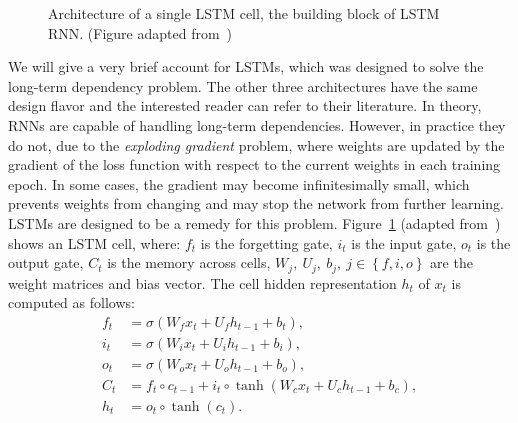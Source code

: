 \documentclass[journal,10pt,twocolumns,letter]{IEEEtran}
\begin{document}
\begin{figure}[!tb]


   \caption{Architecture of a single LSTM cell, the building block of LSTM RNN\@. (Figure adapted
    from~\cite{Colah2015UnderstandingLstmNetworks})}\label{lstm}
\end{figure}

We will give a very brief account for LSTMs, which was designed to solve the long-term dependency
problem. The other three architectures have the same design flavor and the interested reader can
refer to their literature. In theory, RNNs are capable of handling long-term dependencies. However,
in practice they do not, due to the \textit{exploding gradient} problem, where weights are updated
by the gradient of the loss function with respect to the current weights in each training epoch. In
some cases, the gradient may become infinitesimally small, which prevents weights from changing and
may stop the network from further learning. LSTMs are designed to be a remedy for this
problem. Figure~\ref{lstm} (adapted from~\cite{Colah2015UnderstandingLstmNetworks}) shows an LSTM
cell, where: $f_t$ is the forgetting gate, $i_t$ is the input gate, $o_t$ is the output gate, $C_t$
is the memory across cells, $W_j,\ U_j,\ b_j,\ j \in \left\{f, i, o\right\}$ are the weight matrices
and bias vector. The cell hidden representation $h_t$ of $x_t$ is computed as follows:\begin{align*}
  f_t  &= \sigma(W_f  x_t + U_f h_{t-1} + b_t),\\
  i_t  &= \sigma(W_i  x_t + U_i h_{t-1} + b_i),\\
  o_t  &= \sigma(W_o  x_t + U_o h_{t-1} + b_o),\\
  C_t  &= f_t \circ c_{t-1} + i_t \circ \tanh(W_c x_t + U_c h_{t-1} + b_c),\\
  h_t  &= o_t \circ \tanh(c_t).
\end{align*}
\end{document}
